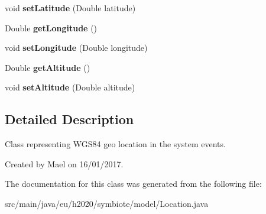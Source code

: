 \begin{DoxyCompactItemize}
\item 
void {\bfseries set\+Latitude} (Double latitude)\hypertarget{classeu_1_1h2020_1_1symbiote_1_1model_1_1Location_a316447fb9be5dd5a3ca9afcfdf3c4036}{}\label{classeu_1_1h2020_1_1symbiote_1_1model_1_1Location_a316447fb9be5dd5a3ca9afcfdf3c4036}

\item 
Double {\bfseries get\+Longitude} ()\hypertarget{classeu_1_1h2020_1_1symbiote_1_1model_1_1Location_ab3f74700ec2e761fe77372df1db18ea3}{}\label{classeu_1_1h2020_1_1symbiote_1_1model_1_1Location_ab3f74700ec2e761fe77372df1db18ea3}

\item 
void {\bfseries set\+Longitude} (Double longitude)\hypertarget{classeu_1_1h2020_1_1symbiote_1_1model_1_1Location_afbcdf51fcb5cd1521720f2331ec607fa}{}\label{classeu_1_1h2020_1_1symbiote_1_1model_1_1Location_afbcdf51fcb5cd1521720f2331ec607fa}

\item 
Double {\bfseries get\+Altitude} ()\hypertarget{classeu_1_1h2020_1_1symbiote_1_1model_1_1Location_aa1a73523159adb38828bae17a0cdd1a5}{}\label{classeu_1_1h2020_1_1symbiote_1_1model_1_1Location_aa1a73523159adb38828bae17a0cdd1a5}

\item 
void {\bfseries set\+Altitude} (Double altitude)\hypertarget{classeu_1_1h2020_1_1symbiote_1_1model_1_1Location_a2aed6d3d3fad8ee4a0e5eb06608d3d1d}{}\label{classeu_1_1h2020_1_1symbiote_1_1model_1_1Location_a2aed6d3d3fad8ee4a0e5eb06608d3d1d}

\end{DoxyCompactItemize}


\subsection{Detailed Description}
Class representing W\+G\+S84 geo location in the system events.

Created by Mael on 16/01/2017. 

The documentation for this class was generated from the following file\+:\begin{DoxyCompactItemize}
\item 
src/main/java/eu/h2020/symbiote/model/Location.\+java\end{DoxyCompactItemize}
